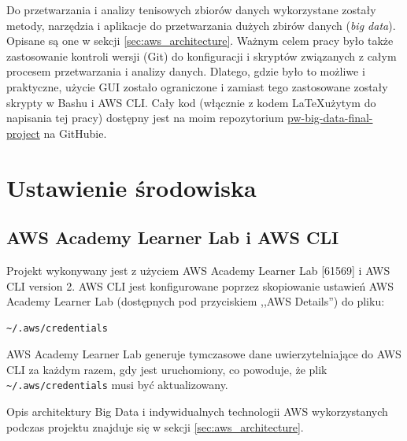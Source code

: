 \documentclass[12pt, a4paper]{article}
\begin{document}
Do przetwarzania i analizy tenisowych zbiorów danych wykorzystane zostały metody, narzędzia i aplikacje do przetwarzania dużych zbirów danych (\textit{big data}). Opisane są one w sekcji \ref{sec:aws_architecture}. Ważnym celem pracy było także zastosowanie kontroli wersji (Git) do konfiguracji i skryptów związanych z całym procesem przetwarzania i analizy danych. Dlatego, gdzie było to możliwe i praktyczne, użycie GUI zostało ograniczone i zamiast tego zastosowane zostały skrypty w Bashu i AWS CLI. Cały kod (włącznie z kodem \LaTeX użytym do napisania tej pracy) dostępny jest na moim repozytorium \href{https://github.com/safurynp/pw-big-data-final-project}{pw-big-data-final-project} na GitHubie.





\section{Ustawienie środowiska}
\subsection{AWS Academy Learner Lab i AWS CLI}
Projekt wykonywany jest z użyciem AWS Academy Learner Lab [61569] i AWS CLI version 2. AWS CLI jest konfigurowane poprzez skopiowanie ustawień AWS Academy Learner Lab (dostępnych pod przyciskiem ,,AWS Details'') do pliku:
\begin{verbatim}
~/.aws/credentials
\end{verbatim}
AWS Academy Learner Lab generuje tymczasowe dane uwierzytelniające do AWS CLI za każdym razem, gdy jest uruchomiony, co powoduje, że plik \verb|~/.aws/credentials| musi być aktualizowany.



Opis architektury Big Data i indywidualnych technologii AWS wykorzystanych podczas projektu znajduje się w sekcji \ref{sec:aws_architecture}.
\end{document}
